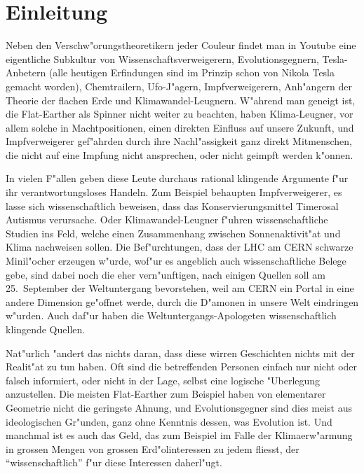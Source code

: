 %
%
%
\chapter*{Einleitung}
Neben den Verschw"orungstheoretikern jeder Couleur findet man
in Youtube eine eigentliche Subkultur von Wissenschaftsverweigerern,
Evolutionsgegnern, Tesla-Anbetern (alle heutigen Erfindungen sind im
Prinzip schon von Nikola Tesla gemacht worden), Chemtrailern, 
Ufo-J"agern,
Impfverweigerern, Anh"angern der Theorie der flachen Erde
und Klimawandel-Leugnern.
W"ahrend man geneigt ist, die Flat-Earther als Spinner nicht weiter
zu beachten, haben Klima-Leugner, vor allem solche in Machtpositionen,
einen direkten Einfluss auf unsere Zukunft, und Impfverweigerer
gef"ahrden durch ihre Nachl"assigkeit ganz direkt Mitmenschen, die
nicht auf eine Impfung nicht ansprechen, oder nicht geimpft werden
k"onnen.

In vielen F"allen geben diese Leute durchaus rational klingende
Argumente f"ur ihr verantwortungsloses Handeln.
Zum Beispiel behaupten Impfverweigerer, es lasse sich wissenschaftlich
beweisen, dass das Konservierungsmittel Timerosal Autismus verursache.
Oder Klimawandel-Leugner f"uhren wissenschaftliche Studien ins Feld,
welche einen Zusammenhang zwischen Sonnenaktivit"at und Klima 
nachweisen sollen.
Die Bef"urchtungen, dass der LHC am CERN schwarze Minil"ocher erzeugen
w"urde, wof"ur es angeblich auch wissenschaftliche Belege gebe,
sind dabei noch die eher vern"unftigen, nach einigen Quellen soll
am 25.~September der Weltuntergang bevorstehen, weil am CERN ein
Portal in eine andere Dimension ge"offnet werde, durch die D"amonen
in unsere Welt eindringen w"urden.
Auch daf"ur haben die Weltuntergangs-Apologeten wissenschaftlich
klingende Quellen.

Nat"urlich "andert das nichts daran, dass diese wirren Geschichten
nichts mit der Realit"at zu tun haben.
Oft sind die betreffenden Personen einfach nur nicht oder falsch
informiert, oder nicht in der Lage, selbst eine logische "Uberlegung
anzustellen.
Die meisten Flat-Earther zum Beispiel haben von elementarer Geometrie
nicht die geringste Ahnung, und Evolutionsgegner sind dies meist aus
ideologischen Gr"unden, ganz ohne Kenntnis dessen, was Evolution ist.
Und manchmal ist es auch das Geld, das zum Beispiel im Falle der 
Klimaerw"armung in grossen Mengen von grossen Erd"olinteressen zu
jedem fliesst, der ``wissenschaftlich'' f"ur diese Interessen
daherl"ugt.

